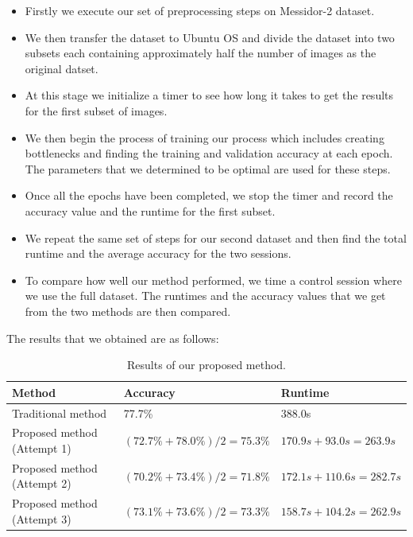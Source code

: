 \documentclass[12pt]{report}
\begin{document}
\begin{itemize}
\item Firstly we execute our set of preprocessing steps on Messidor-2 dataset. 
\item We then transfer the dataset to Ubuntu OS and divide the dataset into two subsets each containing approximately half the number of images as the original datset.
\item At this stage we initialize a timer to see how long it takes to get the results for the first subset of images.
\item We then begin the process of training our process which includes creating bottlenecks and finding the training and validation accuracy at each epoch. The parameters that we determined to be optimal are used for these steps.
\item Once all the epochs have been completed, we stop the timer and record the accuracy value and the runtime for the first subset.
\item We repeat the same set of steps for our second dataset and then find the total runtime and the average accuracy for the two sessions. 
\item To compare how well our method performed, we time a control session where we use the full dataset. The runtimes and the accuracy values that we get from the two methods are then compared. 

\end{itemize}

\noindent The results that we obtained are as follows:

\begin{table}[H]
\begin{center}
\begin{tabular}{ |p{5.5cm}|p{5cm}|p{5cm}| }
 \hline
 Method & Accuracy & Runtime\\ 
 \hline
 Traditional method &  77.7\% &  388.0s \\   
 \hline
 Proposed method (Attempt 1) &  $(72.7\%+78.0\%)/2 = 75.3\%$ &  $170.9s + 93.0s = 263.9 s$\\   
 \hline
 Proposed method (Attempt 2)&  $(70.2\%+73.4\%)/2 = 71.8\%$ &  $172.1s + 110.6s = 282.7s$\\   
 \hline
 Proposed method (Attempt 3)&  $(73.1\%+73.6\%)/2 = 73.3\%$ &  $158.7s + 104.2s = 262.9s$\\   
 \hline
\end{tabular}
\caption{Results of our proposed method.}
\end{center}
\end{table}
\end{document}
